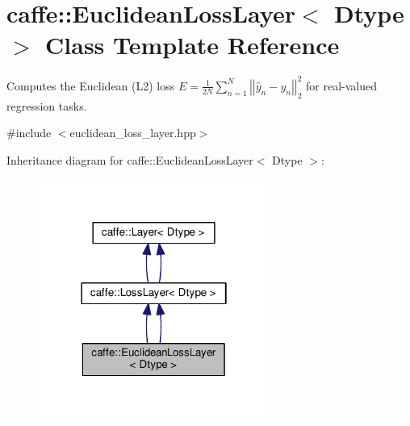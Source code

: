 \hypertarget{classcaffe_1_1_euclidean_loss_layer}{}\section{caffe\+:\+:Euclidean\+Loss\+Layer$<$ Dtype $>$ Class Template Reference}
\label{classcaffe_1_1_euclidean_loss_layer}


Computes the Euclidean (L2) loss $ E = \frac{1}{2N} \sum\limits_{n=1}^N \left| \left| \hat{y}_n - y_n \right| \right|_2^2 $ for real-\/valued regression tasks.  




{\ttfamily \#include $<$euclidean\+\_\+loss\+\_\+layer.\+hpp$>$}



Inheritance diagram for caffe\+:\+:Euclidean\+Loss\+Layer$<$ Dtype $>$\+:
\nopagebreak
\begin{figure}[H]
\begin{center}
\leavevmode
\includegraphics[width=214pt]{classcaffe_1_1_euclidean_loss_layer__inherit__graph}
\end{center}
\end{figure}
